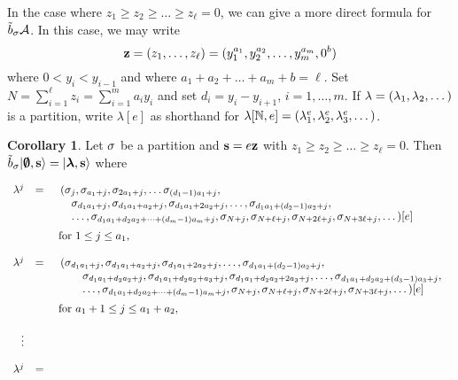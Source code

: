 \documentclass[12pt]{amsart}
\numberwithin{equation}{section}
\theoremstyle{definition}
\newtheorem{corollary}[equation]{Corollary}
\newcommand{\bemp}{\bemptyset}
\newcommand{\mbz}{\mathbf{z}}
\begin{document}
In the case where $z_1\geq z_2\geq\dots\geq z_\ell=0$,
we can give a more direct formula for ${\tilde{b}}_\sigma\mathcal{A}$.
In this case, we may %
write 
$$\mathbf{z}=(z_1,\dots,z_\ell)=(y_1^{a_1}, y_2^{a_2},\dots,y_m^{a_m}, 0^{b})$$
where $0<y_i<y_{i-1}$ and where $a_1+a_2+\dots+a_m+b=\ell$. Set $N=\sum_{i=1}^\ell z_i=\sum_{i=1}^m a_iy_i$ and set $d_i=y_i-y_{i+1}$, $i=1,\dots,m$.
If $\lambda=(\lambda_1,\lambda_2,\dots)$ is a partition, write $\lambda[e]$ as shorthand for $\lambda[\mathbb{N},e]=(\lambda_1^e,\lambda_2^e,\lambda_3^e,\dots)$. 

\begin{corollary} \label{zpartition}
Let $\sigma$ be a partition and $\bs=e\mbz$ with $z_1\geq z_2\geq\dots\geq z_\ell=0$.
Then $\tb_\si|\bemp,\bs\rangle = |\bla,\bs\rangle$ where

$$
\begin{array}{rcll}
\la^j & 
= & 
\begin{array}[t]{l}
(\sigma_j, \sigma_{a_1+j},\sigma_{2a_1+j},\dots \sigma_{(d_1-1)a_1+j}, \\
\quad \sigma_{d_1a_1+j},\sigma_{d_1a_1+a_2+j},\sigma_{d_1a_1+2a_2+j},\dots,\sigma_{d_1a_1+(d_2-1)a_2+j},\\
\quad \dots,\sigma_{d_1a_1+d_2a_2+\dots+(d_m-1)a_m+j},\sigma_{N+j},\sigma_{N+\ell+j},\sigma_{N+2\ell+j},\sigma_{N+3\ell+j},\dots)[e]
\end{array}\vspace{2mm}
\\ 
&& \text{ for } 1\leq j\leq a_1,
\\ \\
\la^j & 
= & 
\begin{array}[t]{l}
(\sigma_{d_1a_1+j},\sigma_{d_1a_1+a_2+j},\sigma_{d_1a_1+2a_2+j},\dots,\sigma_{d_1a_1+(d_2-1)a_2+j}, \\
\quad\quad \sigma_{d_1a_1+d_2a_2+j},\sigma_{d_1a_1+d_2a_2+a_3+j},\sigma_{d_1a_1+d_2a_2+2a_3+j},\dots,\sigma_{d_1a_1+d_2a_2+(d_3-1)a_3+j}, \\
\quad\quad\dots,\sigma_{d_1a_1+d_2a_2+\dots+(d_m-1)a_m+j},\sigma_{N+j},\sigma_{N+\ell+j},\sigma_{N+2\ell+j},\sigma_{N+3\ell+j},\dots)[e]
\end{array}\vspace{2mm}
\\
&&\text{ for } a_1+1\leq j\leq a_1+ a_2,
\\ \\
\vdots
\\ \\
\la^j & 
= & 
\begin{array}[t]{l}

\end{array}
\end{array}$$
\end{corollary}
\end{document}
